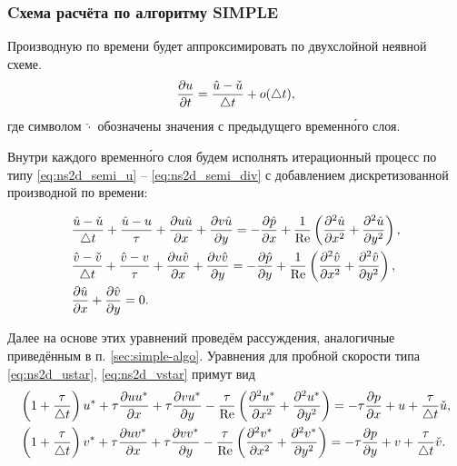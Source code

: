 \subsubsection{Cхема расчёта по алгоритму SIMPLE}
\label{sec:simple-nonstat-algo}

Производную по времени будет аппроксимировать по двухслойной неявной схеме.
\begin{equation*}
\frac{\partial u}{\partial t} = \frac{\hat u - \check u}{\triangle t} + o(\triangle t),
\end{equation*}
где символом $\check\cdot$ обозначены значения с предыдущего временн\'{о}го слоя.

Внутри каждого временн\'{о}го слоя будем исполнять
итерационный процесс по типу \eqref{eq:ns2d_semi_u} -- \eqref{eq:ns2d_semi_div}
с добавлением дискретизованной производной по времени:

\begin{equation}
    \label{eq:ns2d_nonstat_semi}
    \begin{array}{l}
    \displaystyle
    \frac{\hat u - \check u}{\triangle t} + \frac{\hat u - u}{\tau} + \frac{\partial u \hat u}{\partial x} + \frac{\partial v \hat u}{\partial y} =
        -\frac{\partial \hat p}{\partial x}
        + \frac{1}{\mathrm{Re}}\left(\frac{\partial^2 \hat u}{\partial x^2} + \frac{\partial^2 \hat u}{\partial y^2}\right), \\[10pt]
    \displaystyle
    \frac{\hat v - \check v}{\triangle t} + \frac{\hat v - v}{\tau} + \frac{\partial u\hat v}{\partial x} + \frac{\partial v \hat v}{\partial y} =
        -\frac{\partial \hat p}{\partial y}
        + \frac{1}{\mathrm{Re}}\left(\frac{\partial^2 \hat v}{\partial x^2} + \frac{\partial^2 \hat v}{\partial y^2}\right),  \\[10pt]
    \displaystyle
    \frac{\partial \hat u}{\partial x} + \frac{\partial \hat v}{\partial y} = 0.
    \end{array}
\end{equation}

Далее на основе этих уравнений проведём рассуждения, аналогичные приведённым в п. \ref{sec:simple-algo}.
Уравнения для пробной скорости типа \eqref{eq:ns2d_ustar}, \eqref{eq:ns2d_vstar}
примут вид
\begin{equation}
    \label{eq:ns2d_nonstat_uvstar}
    \begin{array}{l}
    \displaystyle
    \left(1 + \frac{\tau}{\triangle t}\right)u^* + \tau\frac{\partial u u^*}{\partial x} + \tau\frac{\partial v u^*}{\partial y}
       - \frac{\tau}{\mathrm{Re}}\left(\frac{\partial^2 u^*}{\partial x^2} + \frac{\partial^2 u^*}{\partial y^2}\right)
       = -\tau\frac{\partial p}{\partial x} + u + \frac\tau{\triangle t} \check u, \\[10pt]
    \displaystyle
    \left(1 + \frac{\tau}{\triangle t}\right)v^* + \tau\frac{\partial u v^*}{\partial x} + \tau\frac{\partial v v^*}{\partial y}
       - \frac{\tau}{\mathrm{Re}}\left(\frac{\partial^2 v^*}{\partial x^2} + \frac{\partial^2 v^*}{\partial y^2}\right)
       = -\tau\frac{\partial p}{\partial y} + v + \frac\tau{\triangle t} \check v.
   \end{array}
\end{equation}


